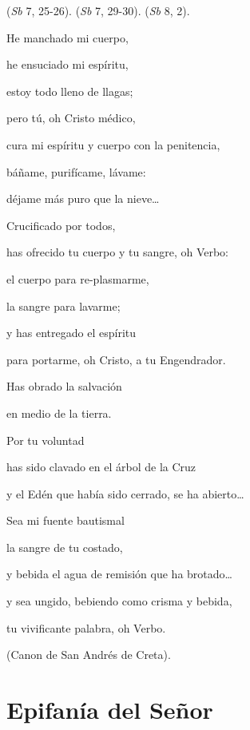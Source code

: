  (\emph{Sb} 7, 25-26).  (\emph{Sb} 7, 29-30).  (\emph{Sb} 8, 2).

He manchado mi cuerpo,

he ensuciado mi espíritu,

estoy todo lleno de llagas;

pero tú, oh Cristo médico,

cura mi espíritu y cuerpo con la penitencia,

báñame, purifícame, lávame:

déjame más puro que la nieve\ldots{}

Crucificado por todos,

has ofrecido tu cuerpo y tu sangre, oh Verbo:

el cuerpo para re-plasmarme,

la sangre para lavarme;

y has entregado el espíritu

para portarme, oh Cristo, a tu Engendrador.

Has obrado la salvación

en medio de la tierra.

Por tu voluntad

has sido clavado en el árbol de la Cruz

y el Edén que había sido cerrado, se ha abierto\ldots{}

Sea mi fuente bautismal

la sangre de tu costado,

y bebida el agua de remisión que ha brotado\ldots{}

y sea ungido, bebiendo como crisma y bebida,

tu vivificante palabra, oh Verbo.

(Canon de San Andrés de Creta).

\chapter{Epifanía del Señor}

